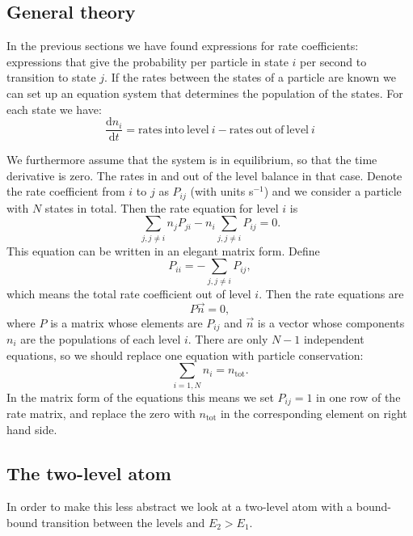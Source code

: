 \documentclass[12pt]{article}
\numberwithin{equation}{section}
\def\dd{\mathrm{d}}
\newcommand{\be}{\begin{equation}}
\newcommand{\ee}{\end{equation}}
\begin{document}
\subsection{General theory}

In the previous sections we have found expressions for rate coefficients: expressions that give the probability per particle in state $i$ per second to transition to state $j$. If the rates between the states of a particle are known we can set up an equation system that determines the population of the states. For each state we have:
\be
\frac{\dd n_i}{\dd t} = \mathrm{rates\ into\ level\ } i - \mathrm{rates\ out\ of\ level\ }i
\ee

We furthermore assume that the system is in equilibrium, so that the time derivative is zero. The rates in and out of the level balance in that case. Denote the rate coefficient from $i$ to $j$ as $P_{ij}$ (with units s$^{-1}$) and we consider a particle with $N$ states in total. Then the rate equation for level $i$ is 
\be
\sum_{j, j \neq i} n_j P_{ji} - n_i \sum_{j, j \neq i} P_{ij} = 0.
\ee
This equation can be written in an elegant matrix form. Define
\be
P_{ii} = - \sum_{j, j \neq i} P_{ij},
\ee
which means the total rate coefficient out of level $i$. Then the rate equations are 
\be
P \vec{n}= 0,
\ee
where $P$ is a matrix whose elements are $P_{ij}$ and $\vec{n}$ is a vector whose components $n_i$ are the populations of each level $i$. There are only $N-1$ independent equations, so we should replace one equation with particle conservation:
\be
\sum_{i=1,N} n_i = n_\mathrm{tot}.
\ee
In the matrix form of the equations this means we set $P_{ij} =1$ in one row of the rate matrix, and replace the zero with $n_\mathrm{tot}$ in the corresponding element on right hand side. 

\subsection{The two-level atom}
In order to make this less abstract we look at a two-level atom with a bound-bound transition between the levels and $E_2>E_1$. 
\end{document}
